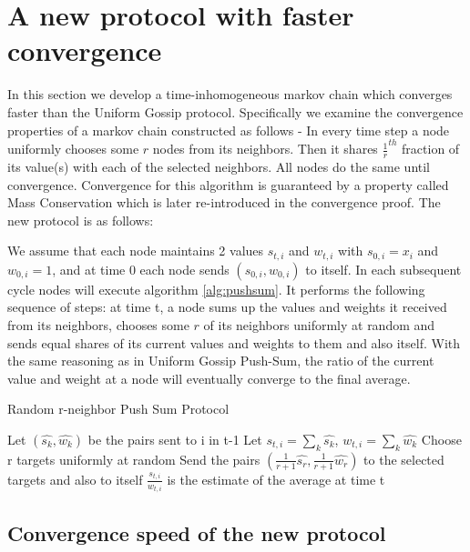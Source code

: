 \documentclass{article}
\begin{document}
\section{A new protocol with faster convergence}

In this section we develop a time-inhomogeneous markov chain which converges faster than the Uniform Gossip protocol. Specifically we examine the convergence properties of a markov chain constructed as follows - In every time step a node uniformly chooses some $r$ nodes from its neighbors. Then it shares $\frac{1}{r}^{th}$ fraction of its value(s) with each of the selected neighbors. All nodes do the same until convergence. Convergence for this algorithm is guaranteed by a property called Mass Conservation \cite{Kempe03gossip-basedcomputation} which is later re-introduced in the convergence proof. The new protocol is as follows:

We assume that each node maintains 2 values $s_{t,i}$  and $w_{t,i}$ with $s_{0,i}=x_i$ and $w_{0,i}=1$, and at time 0 each node sends $(s_{0,i},w_{0,i})$ to itself. In each subsequent cycle nodes will execute algorithm \ref{alg:pushsum}. It performs the following sequence of steps: at time t, a node sums up the values and weights it received from its neighbors, chooses some $r$ of its neighbors uniformly at random and sends equal shares of its current values and weights to them and also itself. With the same reasoning as in Uniform Gossip Push-Sum, the ratio of the current value and weight at a node will eventually converge to the final average.

\begin{algorithm}[tb]
   \caption{Random r-neighbor Push Sum Protocol}
   \label{alg:pushsum}
\begin{algorithmic}[1]
	\STATE Let ${(\hat{s_k},\hat{w_k})}$ be the pairs sent to i in t-1
	\STATE Let $s_{t,i} = \sum_k \hat{s_k}$, $w_{t,i} = \sum_k \hat{w_k}$
	\STATE Choose r targets uniformly at random
	\STATE Send the pairs $(\frac{1}{r+1}\hat{s_r},\frac{1}{r+1}\hat{w_r})$ to the selected targets and also to itself
	\STATE $\frac{s_{t,i}}{w_{t,i}}$ is the estimate of the average at time t
\end{algorithmic}
\end{algorithm}

\subsection{Convergence speed of the new protocol}
\label{convergence}
\end{document}
